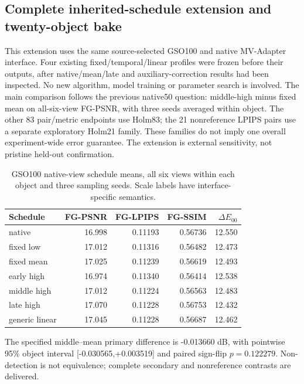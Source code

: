 \documentclass[11pt]{article}
\begin{document}
\subsection*{Complete inherited-schedule extension and twenty-object bake}
This extension uses the same source-selected GSO100 and native MV-Adapter interface. Four existing fixed/temporal/linear profiles were frozen before their outputs, after native/mean/late and auxiliary-correction results had been inspected. No new algorithm, model training or parameter search is involved. The main comparison follows the previous native50 question: middle-high minus fixed mean on all-six-view FG-PSNR, with three seeds averaged within object. The other 83 pair/metric endpoints use Holm83; the 21 nonreference LPIPS pairs use a separate exploratory Holm21 family. These families do not imply one overall experiment-wide error guarantee. The extension is external sensitivity, not pristine held-out confirmation.
\begin{table}[ht]\centering\small\begin{tabular}{lrrrr}\toprule Schedule & FG-PSNR & FG-LPIPS & FG-SSIM & $\Delta E_{00}$ \\\midrule
native & 16.998 & 0.11193 & 0.56736 & 12.550 \\
fixed low & 17.012 & 0.11316 & 0.56482 & 12.473 \\
fixed mean & 17.025 & 0.11239 & 0.56619 & 12.493 \\
early high & 16.974 & 0.11340 & 0.56414 & 12.538 \\
middle high & 17.012 & 0.11224 & 0.56563 & 12.483 \\
late high & 17.070 & 0.11228 & 0.56753 & 12.432 \\
generic linear & 17.045 & 0.11228 & 0.56687 & 12.462 \\
\bottomrule\end{tabular}\caption{GSO100 native-view schedule means, all six views within each object and three sampling seeds. Scale labels have interface-specific semantics.}\end{table}
The specified middle--mean primary difference is -0.013660 dB, with pointwise 95\% object interval [-0.030565,+0.003519] and paired sign-flip $p=0.122279$. Non-detection is not equivalence; complete secondary and nonreference contrasts are delivered.
\end{document}
